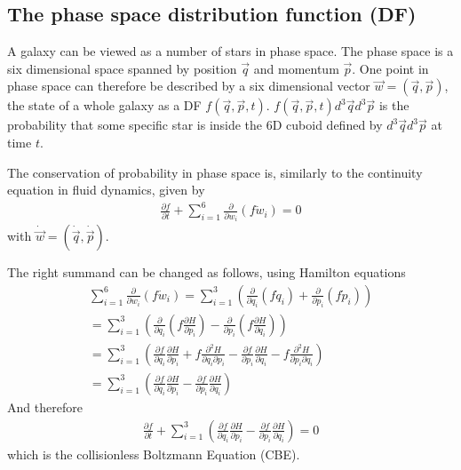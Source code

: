 \documentclass[letterpaper,10pt,english]{sphinxmanual}
\begin{document}
\subsection{The phase space distribution function (DF)}
\label{\detokenize{NBodySimulation/Initialization:the-phase-space-distribution-function-df}}
\sphinxAtStartPar
A galaxy can be viewed as a number of stars in phase space.
The phase space is a six dimensional space spanned by position \(\vec{q}\) and momentum \(\vec{p}\).
One point in phase space can therefore be described by a six dimensional vector \(\vec{w}=(\vec{q},\vec{p})\),
the state of a whole galaxy as a DF \(f(\vec{q},\vec{p},t)\).
\(f(\vec{q},\vec{p},t)d^3\vec{q}d^3\vec{p}\) is the probability that some specific star is inside the 6D cuboid defined by \(d^3\vec{q}d^3\vec{p}\) at time \(t\).

\sphinxAtStartPar
The conservation of probability in phase space is, similarly to the continuity equation in fluid dynamics, given by
\begin{equation*}
\begin{split}\frac{\partial f }{\partial t} + \sum_{i=1}^{6} \frac{\partial}{\partial w_i}(f\dot{w}_i) = 0\end{split}
\end{equation*}
\sphinxAtStartPar
with \(\dot{\vec{w}} = (\dot{\vec{q}},\dot{\vec{p}})\).

\sphinxAtStartPar
The right summand can be changed as follows, using Hamilton equations
\begin{equation*}
\begin{split}\sum_{i=1}^{6} \frac{\partial}{\partial w_i}(f\dot{w}_i)
= \sum_{i=1}^{3} \left ( \frac{\partial}{\partial q_i}\left(f \dot{q}_i\right) + \frac{\partial}{\partial p_i}\left(f\dot{p}_i\right) \right ) \\
= \sum_{i=1}^{3} \left ( \frac{\partial}{\partial q_i}\left(f \frac{\partial H}{\partial p_i}\right) - \frac{\partial}{\partial p_i}\left(f \frac{\partial H}{\partial q_i} \right) \right) \\
= \sum_{i=1}^{3} \left (
\frac{\partial f}{\partial q_i} \frac{\partial H}{\partial p_i}
+ f  \frac{\partial^2 H}{\partial q_i \partial p_i}
- \frac{\partial f}{\partial p_i}  \frac{\partial H}{\partial q_i}
- f \frac{\partial ^2 H}{\partial p_i \partial q_i} \right)  \\
= \sum_{i=1}^{3} \left (
\frac{\partial f}{\partial q_i} \frac{\partial H}{\partial p_i}
- \frac{\partial f}{\partial p_i}  \frac{\partial H}{\partial q_i} \right)\end{split}
\end{equation*}
\sphinxAtStartPar
And therefore
\begin{equation}\label{equation:NBodySimulation/Initialization:collisionless_boltzmann_equation}
\begin{split}\frac{\partial f }{\partial t} + \sum_{i=1}^{3} \left (
 \frac{\partial f}{\partial q_i} \frac{\partial H}{\partial p_i}
 - \frac{\partial f}{\partial p_i}  \frac{\partial H}{\partial q_i} \right) = 0\end{split}
\end{equation}
\sphinxAtStartPar
which is the collisionless Boltzmann Equation (CBE).
\end{document}
